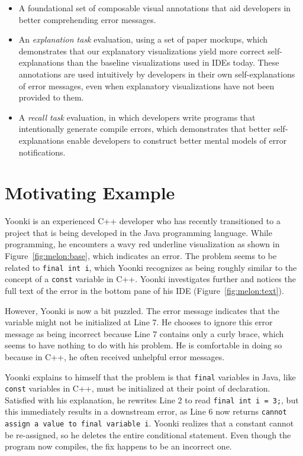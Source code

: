 \documentclass[conference]{IEEEtran}
\begin{document}
\begin{itemize}
\item A foundational set of composable visual annotations that aid developers in better comprehending error messages.
\item An \textit{explanation task} evaluation, using a set of paper mockups, which demonstrates that our explanatory visualizations yield more correct self-explanations than the baseline visualizations used in IDEs today. These annotations are used intuitively by developers in their own self-explanations of error messages, even when explanatory visualizations have not been provided to them.
\item A \textit{recall task} evaluation, in which developers write programs that intentionally generate compile errors, which demonstrates that better self-explanations enable developers to construct better mental models of error notifications.
 
\end{itemize}

\section{Motivating Example}

Yoonki is an experienced C++ developer who has recently transitioned to a project that is being developed in the Java programming language. While programming, he encounters a wavy red underline visualization as shown in Figure~\ref{fig:melon:base}, which indicates an error. The problem seems to be related to \texttt{final int i}, which Yoonki recognizes as being roughly similar to the concept of a \texttt{const} variable in C++. Yoonki investigates further and notices the full text of the error in the bottom pane of his IDE (Figure~\ref{fig:melon:text}). 

However, Yoonki is now a bit puzzled. The error message indicates that the variable might not be initialized at Line 7. He chooses to ignore this error message as being incorrect because Line 7 contains only a curly brace, which seems to have nothing to do with his problem. He is comfortable in doing so because in C++, he often received unhelpful error messages.

Yoonki explains to himself that the problem is that \texttt{final} variables in Java, like \texttt{const} variables in C++, must be initialized at their point of declaration. Satisfied with his explanation, he rewrites Line 2 to read \texttt{final int i = 3;}, but this immediately results in a downstream error, as Line 6 now returns \texttt{cannot assign a value to final variable i}. Yoonki realizes that a constant cannot be re-assigned, so he deletes the entire conditional statement. Even though the program now compiles, the fix happens to be an incorrect one.
\end{document}

